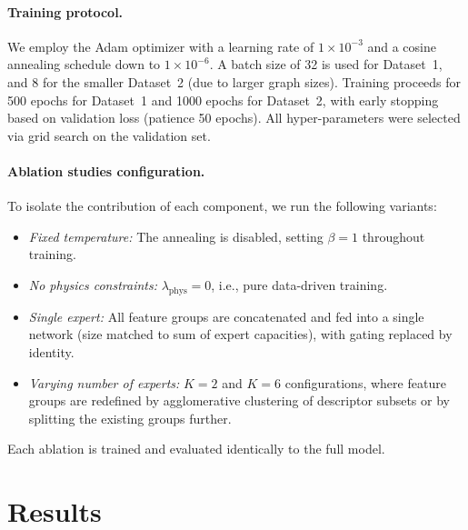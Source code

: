 \documentclass{article}
\begin{document}
\paragraph{Training protocol.}
We employ the Adam optimizer with a learning rate of $1\times10^{-3}$ and a cosine annealing schedule down to $1\times10^{-6}$. A batch size of 32 is used for Dataset~1, and 8 for the smaller Dataset~2 (due to larger graph sizes). Training proceeds for 500 epochs for Dataset~1 and 1000 epochs for Dataset~2, with early stopping based on validation loss (patience 50 epochs). All hyper-parameters were selected via grid search on the validation set.

\paragraph{Ablation studies configuration.}
To isolate the contribution of each component, we run the following variants:
\begin{itemize}
    \item \emph{Fixed temperature:} The annealing is disabled, setting $\beta=1$ throughout training.
    \item \emph{No physics constraints:} $\lambda_{\text{phys}}=0$, i.e., pure data-driven training.
    \item \emph{Single expert:} All feature groups are concatenated and fed into a single network (size matched to sum of expert capacities), with gating replaced by identity.
    \item \emph{Varying number of experts:} $K=2$ and $K=6$ configurations, where feature groups are redefined by agglomerative clustering of descriptor subsets or by splitting the existing groups further.
\end{itemize}
Each ablation is trained and evaluated identically to the full model.

\section{Results}
\end{document}
